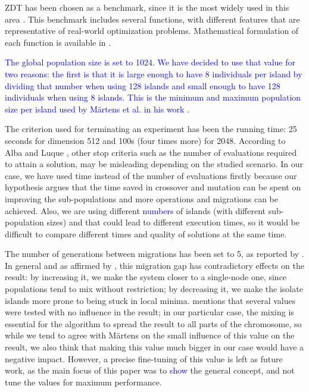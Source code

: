 \documentclass[preprint]{elsarticle}
\begin{document}
ZDT \citep{zdt2000a} has been chosen as a benchmark, since it is the
most widely used in this area
\citep{Deb03distributed,Martens13asynchronous,Wang09parallel,Durillo08masterslave}. This
benchmark includes several functions, with different features that are
representative of real-world optimization problems. Mathematical
formulation of each function is available in \citep{zdt2000a}. 


\textcolor{blue}{The global population size is set to 1024. We have decided to use that value for two reasons: the first is that it is large enough to have 8 individuals per island by dividing that number when using 128 islands and small enough to have 128 individuals when using 8 islands. This is the minimum and maximum population size per island used by M{\"a}rtens et al. in his work \cite{Martens13asynchronous}.}


The criterion used for terminating an experiment has been the running
time: 25 seconds for dimension 512 and 100s (four times more) for
2048. According to Alba and Luque \cite{EVALUATIONPARALLEL}, other stop criteria such as the number of evaluations required to attain a solution, may be misleading depending on the studied scenario. In our case, we have used time instead of the number of evaluations firstly
because our hypothesis argues that the time saved in crossover and
mutation can be spent on improving the sub-populations and more
operations and migrations can be achieved. Also, we are using
different \textcolor{blue}{numbers} of islands (with different sub-population sizes) and that
could lead to different execution times, so it would be difficult to
compare different times and quality of solutions at the same time.

The number of generations between migrations has been set to 5,
as
reported by \cite{Deb03distributed,Martens13asynchronous}. In general
and as affirmed by 
\cite{cantu1998survey}, this migration gap has contradictory effects
on the result: by increasing it, we make the system closer to a
single-node one, since populations tend to mix without restriction; by
decreasing it, we make the isolate islands more prone to being stuck
in local minima. \cite{Martens13asynchronous} mentions that several
values were tested with no influence in the result; in our particular
case, the mixing is essential for the algorithm to spread the result
to all parts of the chromosome, so while we tend to agree with
M{\"a}rtens on the small influence of this value on the result, we also
think that making this value much bigger in our case would have a
negative impact. However, a precise fine-tuning of this value is left
as future work, as the main focus of this paper was to \textcolor{blue}{show} the
general concept, and not tune the values for maximum performance.
\end{document}
